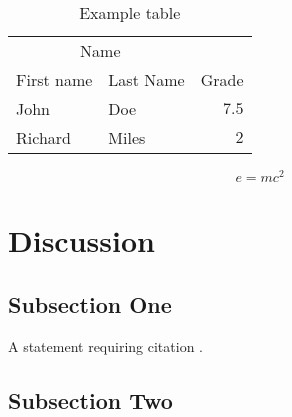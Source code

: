 \documentclass[twoside,twocolumn]{article}
\begin{document}
\begin{table}
\caption{Example table}
\centering
\begin{tabular}{llr}
\toprule
\multicolumn{2}{c}{Name} \\
\cmidrule(r){1-2}
First name & Last Name & Grade \\
\midrule
John & Doe & $7.5$ \\
Richard & Miles & $2$ \\
\bottomrule
\end{tabular}
\end{table}

\blindtext %

\begin{equation}
\label{eq:emc}
e = mc^2
\end{equation}

\blindtext %


\section{Discussion}

\subsection{Subsection One}

A statement requiring citation \cite{Figueredo:2009dg}.
\blindtext %

\subsection{Subsection Two}

\blindtext %

\end{document}
